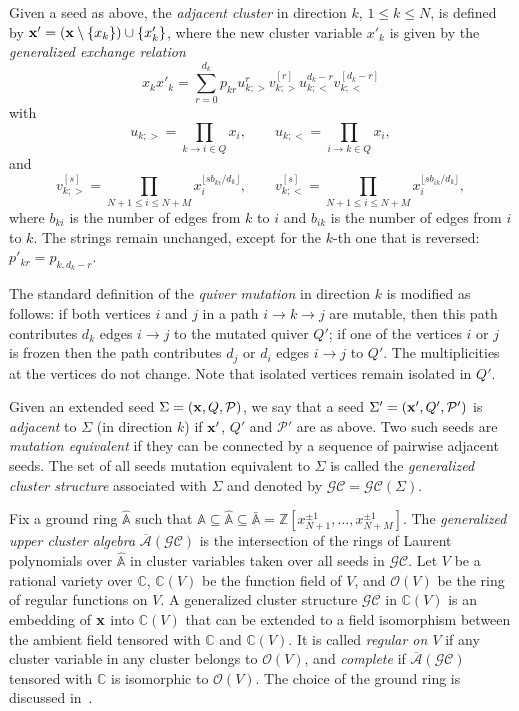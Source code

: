 \documentclass{amsart}
\theoremstyle{definition}
\theoremstyle{remark}
\numberwithin{equation}{section}
\numberwithin{theorem}{section}
\def\A{{\mathcal A}}
\def\AA{{\mathbb A}}
\def\C{{\mathbb C}}
\def\CC{{\mathcal C}}
\def\F{{\mathbb F}}
\def\G{{\mathcal G}}
\def\GCC{{\G\CC}}
\def\O{{\mathcal O}}
\def\P{{\mathcal P}}
\def\UC{\overline{\A}}
\def\Z{{\mathbb Z}}
\def\x{{\bf x}}
\begin{document}
Given a seed as above, the {\em adjacent cluster\/} in direction $k$, $1\le k\le N$,
is defined by $\x'=(\x\setminus\{x_k\})\cup\{x'_k\}$,
where the new cluster variable $x'_k$ is given by the {\em generalized exchange relation}
\begin{equation}\label{genger}
x_kx'_k=\sum_{r=0}^{d_k}p_{kr}u_{k;>}^r v_{k;>}^{[r]}u_{k;<}^{d_k-r}v_{k;<}^{[d_k-r]}
\end{equation}
with
\begin{equation*}
u_{k;>}=\prod_{k\to i\in Q} x_i,\qquad  u_{k;<}=\prod_{i\to k \in Q}x_i,
\end{equation*}
and 
\begin{equation*}\label{stable}
v_{k;>}^{[s]}=\prod_{N+1\le i\le N+M}x_i^{\lfloor sb_{ki}/d_k\rfloor},\qquad
v_{k;<}^{[s]}=\prod_{N+1\le i\le N+M}x_i^{\lfloor sb_{ik}/d_k\rfloor},
\end{equation*}
where $b_{ki}$ is the number of edges from $k$ to $i$ and $b_{ik}$ is the number of edges from $i$ to $k$.
The strings remain unchanged, except for the $k$-th one that is reversed:  $p'_{kr}=p_{k,d_k-r}$. 

The standard definition of the {\it quiver mutation\/} in direction $k$ is modified as follows: 
if both vertices $i$ and $j$
in a path $i\to k\to j$ are mutable, then this path contributes $d_k$ edges $i\to j$ to the mutated quiver $Q'$; if one of the vertices $i$ or $j$ is frozen then the path contributes $d_j$ or $d_i$ edges $i\to j$ to $Q'$. The multiplicities at the vertices do not change. Note that isolated vertices remain isolated in $Q'$.

Given an extended seed $\Sigma=(\x,Q,\P)$, we say that a seed
$\Sigma'=(\x',Q',\P')$ is {\em adjacent\/} to $\Sigma$ (in direction
$k$) if $\x'$, $Q'$ and $\P'$ are as above. 
Two such seeds are {\em mutation equivalent\/} if they can
be connected by a sequence of pairwise adjacent seeds. 
The set of all seeds mutation equivalent to $\Sigma$ is called the {\it generalized cluster structure\/}  associated with $\Sigma$ and denoted by $\GCC=\GCC(\Sigma)$.

Fix a ground ring $\widehat{\AA}$ such that $\AA\subseteq\widehat\AA\subseteq\bar\AA=\Z[x_{N+1}^{\pm1},\dots,x_{N+M}^{\pm1}]$. The {\it generalized upper cluster algebra\/}
$\UC(\GCC)$ is the intersection of the rings of Laurent polynomials over $\widehat{\AA}$ in cluster variables taken over all seeds in $\GCC$. Let $V$ be a rational variety over $\C$, $\C(V)$ be the function field of $V$, and $\O(V)$ be the ring of regular functions on $V$. A generalized cluster structure $\GCC$
in $\C(V)$ is an embedding of $\x$ into $\C(V)$ that can be extended to a field isomorphism between 
the ambient field tensored with $\C$ and $\C(V)$. 
It is called {\it regular on $V$\/} if any cluster variable in any cluster belongs to $\O(V)$, and {\it complete\/} if 
$\UC(\GCC)$ tensored with $\C$ is isomorphic to $\O(V)$. The choice of the ground ring is discussed 
in~\cite[Section 2.1]{GSVdouble}.
\end{document}
